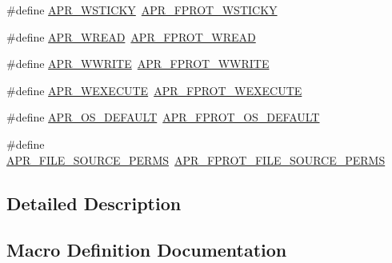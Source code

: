 \begin{DoxyCompactItemize}
\item 
\#define \hyperlink{group__apr__file__permissions_ga824d6685d59e3efddb6ee7fdbee69c13}{A\+P\+R\+\_\+\+W\+S\+T\+I\+C\+KY}~\hyperlink{group__apr__file__permissions_ga989dbea02f779a5f20a643d7e4ee9952}{A\+P\+R\+\_\+\+F\+P\+R\+O\+T\+\_\+\+W\+S\+T\+I\+C\+KY}
\item 
\#define \hyperlink{group__apr__file__permissions_ga5c987d2b1ace95b4ffa7c5a322721aad}{A\+P\+R\+\_\+\+W\+R\+E\+AD}~\hyperlink{group__apr__file__permissions_ga194718630250b0f0dd4be38c86dac717}{A\+P\+R\+\_\+\+F\+P\+R\+O\+T\+\_\+\+W\+R\+E\+AD}
\item 
\#define \hyperlink{group__apr__file__permissions_ga7aac61689e9aaa93176bdb4911f56863}{A\+P\+R\+\_\+\+W\+W\+R\+I\+TE}~\hyperlink{group__apr__file__permissions_ga51692a9828f5b6288d89495378944260}{A\+P\+R\+\_\+\+F\+P\+R\+O\+T\+\_\+\+W\+W\+R\+I\+TE}
\item 
\#define \hyperlink{group__apr__file__permissions_ga7bf4afea195c62f41aad1d3e94dcdac6}{A\+P\+R\+\_\+\+W\+E\+X\+E\+C\+U\+TE}~\hyperlink{group__apr__file__permissions_ga760d69c09b38ddf1e0aff09362d8ce11}{A\+P\+R\+\_\+\+F\+P\+R\+O\+T\+\_\+\+W\+E\+X\+E\+C\+U\+TE}
\item 
\#define \hyperlink{group__apr__file__permissions_ga8552adb50d545d5fc7faeabb4f4a388f}{A\+P\+R\+\_\+\+O\+S\+\_\+\+D\+E\+F\+A\+U\+LT}~\hyperlink{group__apr__file__permissions_gad3c65a67ee6eb12ecc6a33857397900b}{A\+P\+R\+\_\+\+F\+P\+R\+O\+T\+\_\+\+O\+S\+\_\+\+D\+E\+F\+A\+U\+LT}
\item 
\#define \hyperlink{group__apr__file__permissions_gaa72c8bc4ab1bd5615bee4333d23dc16b}{A\+P\+R\+\_\+\+F\+I\+L\+E\+\_\+\+S\+O\+U\+R\+C\+E\+\_\+\+P\+E\+R\+MS}~\hyperlink{group__apr__file__permissions_gac08d4e868c7c9532f7c97c70556663dc}{A\+P\+R\+\_\+\+F\+P\+R\+O\+T\+\_\+\+F\+I\+L\+E\+\_\+\+S\+O\+U\+R\+C\+E\+\_\+\+P\+E\+R\+MS}
\end{DoxyCompactItemize}


\subsection{Detailed Description}


\subsection{Macro Definition Documentation}
